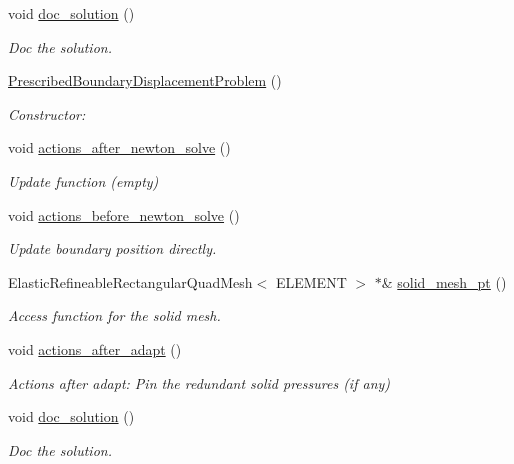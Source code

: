 \begin{DoxyCompactItemize}
void \hyperlink{classPrescribedBoundaryDisplacementProblem_abc58821d6b49cd9773dcd90b240aab6e}{doc\+\_\+solution} ()
\begin{DoxyCompactList}\small\item\em Doc the solution. \end{DoxyCompactList}\item 
\hyperlink{classPrescribedBoundaryDisplacementProblem_ac0c8b47eeb75ba2c618757e6b56e62dc}{Prescribed\+Boundary\+Displacement\+Problem} ()
\begin{DoxyCompactList}\small\item\em Constructor\+: \end{DoxyCompactList}\item 
void \hyperlink{classPrescribedBoundaryDisplacementProblem_a53e7d18d9d748388160d6c4106f1d493}{actions\+\_\+after\+\_\+newton\+\_\+solve} ()
\begin{DoxyCompactList}\small\item\em Update function (empty) \end{DoxyCompactList}\item 
void \hyperlink{classPrescribedBoundaryDisplacementProblem_ad2184bb8d7391da21bec62d4aacf5c20}{actions\+\_\+before\+\_\+newton\+\_\+solve} ()
\begin{DoxyCompactList}\small\item\em Update boundary position directly. \end{DoxyCompactList}\item 
Elastic\+Refineable\+Rectangular\+Quad\+Mesh$<$ E\+L\+E\+M\+E\+NT $>$ $\ast$\& \hyperlink{classPrescribedBoundaryDisplacementProblem_ac0fc3028f61cec5ac4b01670d7728934}{solid\+\_\+mesh\+\_\+pt} ()
\begin{DoxyCompactList}\small\item\em Access function for the solid mesh. \end{DoxyCompactList}\item 
void \hyperlink{classPrescribedBoundaryDisplacementProblem_aae7225db18ad5c8429c0eb96fa37b585}{actions\+\_\+after\+\_\+adapt} ()
\begin{DoxyCompactList}\small\item\em Actions after adapt\+: Pin the redundant solid pressures (if any) \end{DoxyCompactList}\item 
void \hyperlink{classPrescribedBoundaryDisplacementProblem_abc58821d6b49cd9773dcd90b240aab6e}{doc\+\_\+solution} ()
\begin{DoxyCompactList}\small\item\em Doc the solution. \end{DoxyCompactList}\item 

\end{DoxyCompactItemize}

